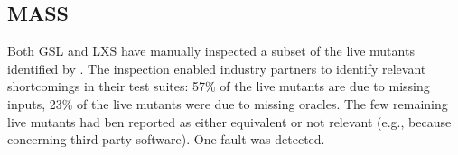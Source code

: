 \subsection{MASS}

%
%
%
%
%
%
%

Both GSL and LXS have manually inspected a subset of the live mutants identified by \MASS. The inspection enabled industry partners to identify relevant shortcomings in their test suites: 
 57\% of the live mutants are due to missing inputs, 
 23\% of the live mutants were due to missing oracles. The few remaining live mutants had ben reported as either equivalent or not relevant (e.g., because concerning third party software).
 One fault was detected. 



